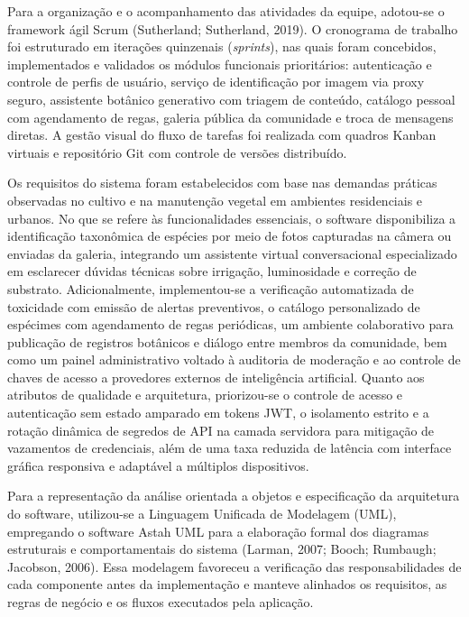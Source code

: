 \documentclass[12pt,a4paper]{article}
\begin{document}
Para a organização e o acompanhamento das atividades da equipe, adotou-se o framework ágil Scrum (Sutherland; Sutherland, 2019). O cronograma de trabalho foi estruturado em iterações quinzenais (\textit{sprints}), nas quais foram concebidos, implementados e validados os módulos funcionais prioritários: autenticação e controle de perfis de usuário, serviço de identificação por imagem via proxy seguro, assistente botânico generativo com triagem de conteúdo, catálogo pessoal com agendamento de regas, galeria pública da comunidade e troca de mensagens diretas. A gestão visual do fluxo de tarefas foi realizada com quadros Kanban virtuais e repositório Git com controle de versões distribuído.

Os requisitos do sistema foram estabelecidos com base nas demandas práticas observadas no cultivo e na manutenção vegetal em ambientes residenciais e urbanos. No que se refere às funcionalidades essenciais, o software disponibiliza a identificação taxonômica de espécies por meio de fotos capturadas na câmera ou enviadas da galeria, integrando um assistente virtual conversacional especializado em esclarecer dúvidas técnicas sobre irrigação, luminosidade e correção de substrato. Adicionalmente, implementou-se a verificação automatizada de toxicidade com emissão de alertas preventivos, o catálogo personalizado de espécimes com agendamento de regas periódicas, um ambiente colaborativo para publicação de registros botânicos e diálogo entre membros da comunidade, bem como um painel administrativo voltado à auditoria de moderação e ao controle de chaves de acesso a provedores externos de inteligência artificial. Quanto aos atributos de qualidade e arquitetura, priorizou-se o controle de acesso e autenticação sem estado amparado em tokens JWT, o isolamento estrito e a rotação dinâmica de segredos de API na camada servidora para mitigação de vazamentos de credenciais, além de uma taxa reduzida de latência com interface gráfica responsiva e adaptável a múltiplos dispositivos.

Para a representação da análise orientada a objetos e especificação da arquitetura do software, utilizou-se a Linguagem Unificada de Modelagem (UML), empregando o software Astah UML para a elaboração formal dos diagramas estruturais e comportamentais do sistema (Larman, 2007; Booch; Rumbaugh; Jacobson, 2006). Essa modelagem favoreceu a verificação das responsabilidades de cada componente antes da implementação e manteve alinhados os requisitos, as regras de negócio e os fluxos executados pela aplicação.
\end{document}

